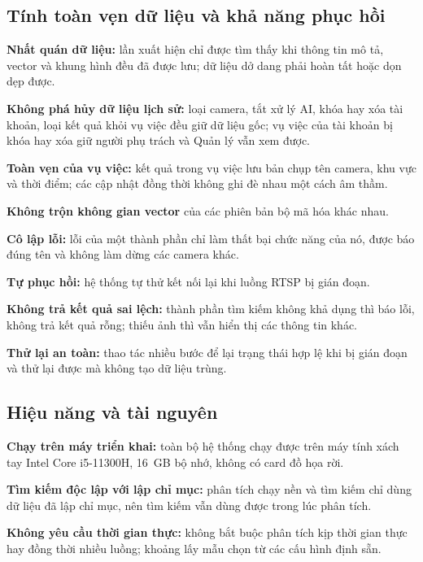 \subsection{Tính toàn vẹn dữ liệu và khả năng phục hồi}
\label{sec:4.3.2}
\label{sec:4.3.3}

\begin{reqlist}
    \item[NFR-06] \textbf{Nhất quán dữ liệu:} lần xuất hiện chỉ được tìm thấy khi thông tin mô tả, vector và khung hình đều đã được lưu; dữ liệu dở dang phải hoàn tất hoặc dọn dẹp được.
    \item[NFR-07] \textbf{Không phá hủy dữ liệu lịch sử:} loại camera, tắt xử lý AI, khóa hay xóa tài khoản, loại kết quả khỏi vụ việc đều giữ dữ liệu gốc; vụ việc của tài khoản bị khóa hay xóa giữ người phụ trách và Quản lý vẫn xem được.
    \item[NFR-08] \textbf{Toàn vẹn của vụ việc:} kết quả trong vụ việc lưu bản chụp tên camera, khu vực và thời điểm; các cập nhật đồng thời không ghi đè nhau một cách âm thầm.
    \item[NFR-09] \textbf{Không trộn không gian vector} của các phiên bản bộ mã hóa khác nhau.
    \item[NFR-10] \textbf{Cô lập lỗi:} lỗi của một thành phần chỉ làm thất bại chức năng của nó, được báo đúng tên và không làm dừng các camera khác.
    \item[NFR-11] \textbf{Tự phục hồi:} hệ thống tự thử kết nối lại khi luồng RTSP bị gián đoạn.
    \item[NFR-12] \textbf{Không trả kết quả sai lệch:} thành phần tìm kiếm không khả dụng thì báo lỗi, không trả kết quả rỗng; thiếu ảnh thì vẫn hiển thị các thông tin khác.
    \item[NFR-13] \textbf{Thử lại an toàn:} thao tác nhiều bước để lại trạng thái hợp lệ khi bị gián đoạn và thử lại được mà không tạo dữ liệu trùng.
\end{reqlist}

\subsection{Hiệu năng và tài nguyên}
\label{sec:4.3.4}

\begin{reqlist}
    \item[NFR-14] \textbf{Chạy trên máy triển khai:} toàn bộ hệ thống chạy được trên máy tính xách tay Intel Core i5-11300H, 16~GB bộ nhớ, không có card đồ họa rời.
    \item[NFR-15] \textbf{Tìm kiếm độc lập với lập chỉ mục:} phân tích chạy nền và tìm kiếm chỉ dùng dữ liệu đã lập chỉ mục, nên tìm kiếm vẫn dùng được trong lúc phân tích.
    \item[NFR-16] \textbf{Không yêu cầu thời gian thực:} không bắt buộc phân tích kịp thời gian thực hay đồng thời nhiều luồng; khoảng lấy mẫu chọn từ các cấu hình định sẵn.
\end{reqlist}

